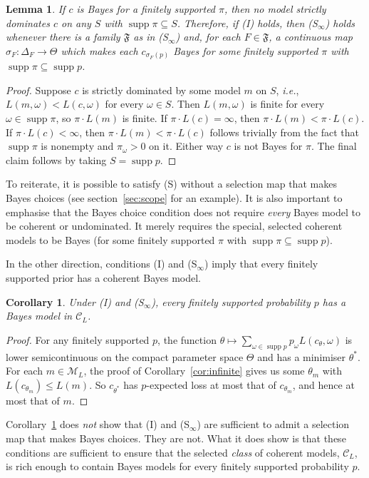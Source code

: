 \documentclass[11pt]{article}
\newtheorem{lemma}[theorem]{Lemma}
\newtheorem{corollary}[theorem]{Corollary}
\theoremstyle{definition}
\theoremstyle{remark}
\newcommand{\M}{\mathcal M}
\newcommand{\C}{\mathcal C}
\newcommand{\F}{\mathfrak F}
\newcommand{\supp}{\operatorname{supp}}
\begin{document}
\begin{lemma}\label{lem:bayes-choice}
If $c$ is Bayes for a finitely supported $\pi$, then no model strictly dominates $c$ on any $S$ with $\supp\pi\subseteq S$. Therefore, if (I) holds, then (S$_\infty$) holds whenever there is a family $\F$ as in (S$_\infty$) and, for each $F\in\F$, a continuous map $\sigma_F:\Delta_F\to\Theta$ which makes each $c_{\sigma_F(p)}$ Bayes for some finitely supported $\pi$ with $\supp\pi\subseteq\supp p$.
\end{lemma}
\begin{proof}
Suppose $c$ is strictly dominated by some model $m$ on $S$, \textit{i.e.}, $L(m,\omega)<L(c,\omega)$ for every $\omega\in S$. Then $L(m,\omega)$ is finite for every $\omega\in\supp\pi$, so $\pi\cdot L(m)$ is finite. If $\pi\cdot L(c)=\infty$, then $\pi\cdot L(m)<\pi\cdot L(c)$. If $\pi\cdot L(c)<\infty$, then $\pi\cdot L(m)<\pi\cdot L(c)$ follows trivially from the fact that $\supp\pi$ is nonempty and $\pi_\omega>0$ on it. Either way $c$ is not Bayes for $\pi$. The final claim follows by taking $S=\supp p$.
\end{proof}

To reiterate, it is possible to satisfy (S) without a selection map that makes Bayes choices (see section~\ref{sec:scope} for an example). It is also important to emphasise that the Bayes choice condition does not require \emph{every} Bayes model to be coherent or undominated. It merely requires the special, selected coherent models to be Bayes (for some finitely supported $\pi$ with $\supp\pi\subseteq\supp p$). 



In the other direction, conditions (I) and (S$_\infty$) imply that every finitely supported prior has a coherent Bayes model. 
\begin{corollary}\label{cor:bayes}
Under (I) and (S$_\infty$), every finitely supported probability $p$ has a Bayes model in $\C_L$.
\end{corollary}
\begin{proof}
For any finitely supported $p$, the function $\theta\mapsto\sum_{\omega\in\supp p}p_\omega L(c_\theta,\omega)$ is lower semicontinuous on the compact parameter space $\Theta$ and has a minimiser $\theta^*$. For each $m\in\M_L$, the proof of Corollary~\ref{cor:infinite} gives us some $\theta_m$ with $L(c_{\theta_m})\le L(m)$. So $c_{\theta^*}$ has $p$-expected loss at most that of $c_{\theta_m}$, and hence at most that of $m$.
\end{proof}
Corollary~\ref{cor:bayes} does \textit{not} show that (I) and (S$_\infty$) are sufficient to admit a selection map that makes Bayes choices. They are not. What it does show is that these conditions are sufficient to ensure that the selected \textit{class} of coherent models, $\C_L$, is rich enough to contain Bayes models for every finitely supported probability $p$.
\end{document}
